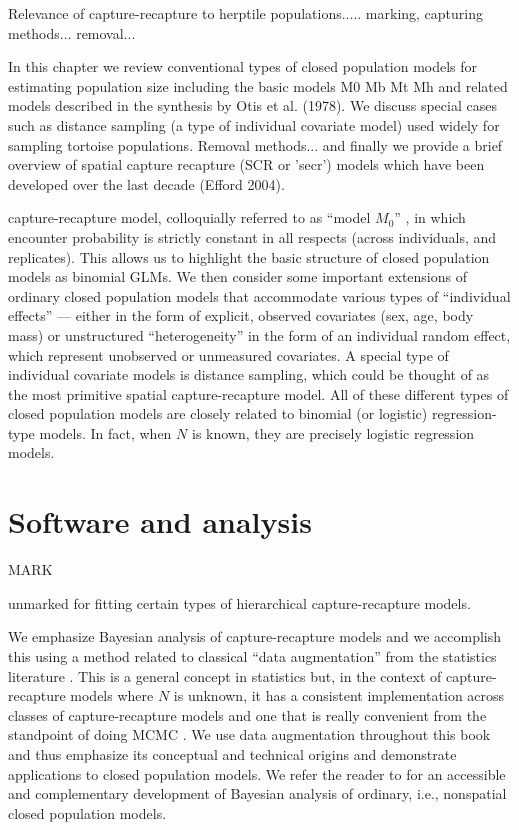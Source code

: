 \documentclass{book}
\begin{document}
Relevance of capture-recapture to herptile populations..... marking,
capturing methods... removal...

In this chapter we review conventional types of closed population
models for estimating population size including the basic models M0 Mb
Mt Mh and related models described in the synthesis by Otis et
al. (1978).  We discuss special cases such as distance sampling (a
type of individual covariate model) used widely for sampling tortoise
populations. Removal methods... and finally we provide a brief
overview of spatial capture recapture (SCR or 'secr') models which
have been developed over the last decade (Efford 2004). 


capture-recapture model, colloquially referred to as ``model $M_0$''
\citep{otis_etal:1978}, in which encounter probability is strictly
constant in all respects (across individuals, and replicates).  This
allows us to highlight the basic structure of closed population models
as binomial GLMs.  We then consider some important extensions of
ordinary closed population models that accommodate various types of
``individual effects'' --- either in the form of explicit, observed
covariates (sex, age, body mass) or unstructured ``heterogeneity'' in
the form of an individual random effect, which represent 
unobserved or unmeasured covariates.  A special type of individual
covariate models is distance sampling, which could be thought of as
the most primitive spatial capture-recapture model.  All of these
different types of closed population models are closely related to
binomial (or logistic) regression-type models. In fact, when $N$ is
known, they are precisely logistic regression models.









\section{Software and analysis}

MARK

unmarked for fitting certain types of hierarchical capture-recapture
models. 

We emphasize Bayesian analysis of capture-recapture models and we
accomplish this using a method related to classical ``data
augmentation'' from the statistics literature
\citep[e.g.,][]{tanner_wong:1987}.  This is a general concept in
statistics but, in the context of capture-recapture models where $N$
is unknown, it has a consistent implementation across classes of
capture-recapture models and one that is really convenient from the
standpoint of doing MCMC
\citep{royle_etal:2007,royle_dorazio:2012}. We use data augmentation
throughout this book and thus emphasize its conceptual and technical
origins and demonstrate applications to closed population models.  We
refer the reader to \citet[][ch. 6]{kery_schaub:2011} for an
accessible and complementary development of Bayesian analysis of
ordinary, i.e., nonspatial closed population models.
\end{document}

